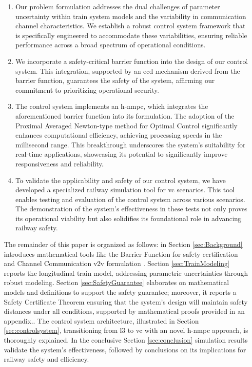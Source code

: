 \begin{enumerate}
	
	\item Our problem formulation addresses the dual challenges of parameter uncertainty within train system models and the variability in communication channel characteristics. We establish a robust control system framework that is specifically engineered to accommodate these variabilities, ensuring reliable performance across a broad spectrum of operational conditions.
	
	
	\item We incorporate a safety-critical barrier function into the design of our control system. This integration, supported by an \gls{ecd} mechanism derived from the barrier function, guarantees the safety of the system, affirming our commitment to prioritizing operational security.
	
	\item The control system implements an \gls{h-nmpc}, which integrates the aforementioned barrier function into its formulation. The adoption of the Proximal Averaged Newton-type method for Optimal Control significantly enhances computational efficiency, achieving processing speeds in the millisecond range. This breakthrough underscores the system's suitability for real-time applications, showcasing its potential to significantly improve responsiveness and reliability.
	
	\item To validate the applicability and safety of our control system, we have developed a specialized railway simulation tool for \gls{vc} scenarios. This tool enables testing and evaluation of the control system across various scenarios. The demonstration of the system's effectiveness in these tests not only proves its operational viability but also solidifies its foundational role in advancing railway safety.
\end{enumerate}
%
The remainder of this paper is organized as follows: 
in Section \ref{sec:Background} introduces mathematical tools like the Barrier Function for safety certification and Channel Communication \gls{v2v} formulation . Section \ref{sec:TrainModeling} reports the longitudinal train model, addressing parametric uncertainties through robust modeling. Section \ref{sec:SafetyGuarantee} elaborates on mathematical models and definitions to support the safety guarantee; moreover, it reports a Safety Certificate Theorem ensuring that the system's design will maintain safety distances under all conditions, supported by mathematical proofs provided in an appendix.. The control system architecture, illustrated in Section \ref{sec:controlsystem}, transitioning from \gls{l3} to \gls{vc} with an novel \gls{h-nmpc} approach, is thoroughly explained. In the conclusive Section \ref{sec:conclusion} simulation results validate the system's effectiveness, followed by conclusions on its implications for railway safety and efficiency.








